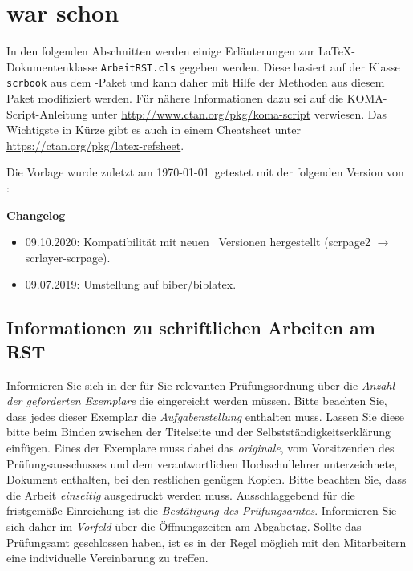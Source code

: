 \chapter{war schon}
In den folgenden Abschnitten werden einige Erläuterungen zur \LaTeX-Dokumentenklasse \texttt{ArbeitRST.cls} gegeben werden. Diese basiert auf der Klasse \texttt{scrbook} aus dem \KOMAScript-Paket und kann daher mit Hilfe der Methoden aus diesem Paket modifiziert werden. Für nähere Informationen dazu sei auf die KOMA-Script-Anleitung unter \url{http://www.ctan.org/pkg/koma-script} verwiesen. Das Wichtigste in Kürze gibt es auch in einem Cheatsheet unter \url{https://ctan.org/pkg/latex-refsheet}.

Die Vorlage wurde zuletzt am \today~getestet mit der folgenden Version von \KOMAScript: \KOMAScriptVersion 

\textbf{Changelog}
\begin{itemize}
	\item 09.10.2020: Kompatibilität mit neuen \KOMAScript~Versionen hergestellt (scrpage2 $\rightarrow$ scrlayer-scrpage).
	\item 09.07.2019: Umstellung auf biber/biblatex.
\end{itemize}

\section{Informationen zu schriftlichen Arbeiten am RST}
Informieren Sie sich in der für Sie relevanten Prüfungsordnung über die \emph{Anzahl der geforderten Exemplare} die eingereicht werden müssen. Bitte beachten Sie, dass jedes dieser Exemplar die \emph{Aufgabenstellung} enthalten muss. Lassen Sie diese bitte beim Binden zwischen der Titelseite und der Selbstständigkeitserklärung einfügen. Eines der Exemplare muss dabei das \emph{originale}, vom Vorsitzenden des Prüfungsausschusses und dem verantwortlichen Hochschullehrer unterzeichnete, Dokument enthalten, bei den restlichen genügen Kopien. Bitte beachten Sie, dass die Arbeit \emph{einseitig} ausgedruckt werden muss. Ausschlaggebend für die fristgemäße Einreichung ist die \emph{Bestätigung des Prüfungsamtes}. Informieren Sie sich daher im \emph{Vorfeld} über die Öffnungszeiten am Abgabetag. Sollte das Prüfungsamt geschlossen haben, ist es in der Regel möglich mit den Mitarbeitern eine individuelle Vereinbarung zu treffen.


